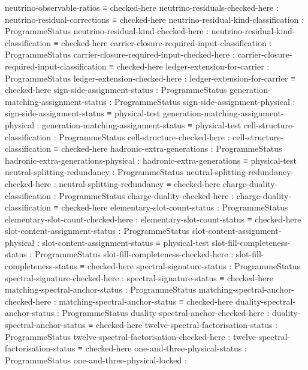 \documentclass[11pt]{article}
\begin{document}
\begin{code}
      neutrino-observable-ratios ≡ checked-here
    neutrino-residuals-checked-here :
      neutrino-residual-corrections ≡ checked-here
    neutrino-residual-kind-classification : ProgrammeStatus
    neutrino-residual-kind-checked-here :
      neutrino-residual-kind-classification ≡ checked-here
    carrier-closure-required-input-classification : ProgrammeStatus
    carrier-closure-required-input-checked-here :
      carrier-closure-required-input-classification ≡ checked-here
    ledger-extension-for-carrier  : ProgrammeStatus
    ledger-extension-checked-here :
      ledger-extension-for-carrier ≡ checked-here
    sign-side-assignment-status   : ProgrammeStatus
    generation-matching-assignment-status : ProgrammeStatus
    sign-side-assignment-physical :
      sign-side-assignment-status ≡ physical-test
    generation-matching-assignment-physical :
      generation-matching-assignment-status ≡ physical-test
    cell-structure-classification : ProgrammeStatus
    cell-structure-checked-here :
      cell-structure-classification ≡ checked-here
    hadronic-extra-generations    : ProgrammeStatus
    hadronic-extra-generations-physical :
      hadronic-extra-generations ≡ physical-test
    neutral-splitting-redundancy  : ProgrammeStatus
    neutral-splitting-redundancy-checked-here :
      neutral-splitting-redundancy ≡ checked-here
    charge-duality-classification : ProgrammeStatus
    charge-duality-checked-here   :
      charge-duality-classification ≡ checked-here
    elementary-slot-count-status  : ProgrammeStatus
    elementary-slot-count-checked-here :
      elementary-slot-count-status ≡ checked-here
    slot-content-assignment-status : ProgrammeStatus
    slot-content-assignment-physical :
      slot-content-assignment-status ≡ physical-test
    slot-fill-completeness-status : ProgrammeStatus
    slot-fill-completeness-checked-here :
      slot-fill-completeness-status ≡ checked-here
    spectral-signature-status     : ProgrammeStatus
    spectral-signature-checked-here :
      spectral-signature-status ≡ checked-here
    matching-spectral-anchor-status : ProgrammeStatus
    matching-spectral-anchor-checked-here :
      matching-spectral-anchor-status ≡ checked-here
    duality-spectral-anchor-status : ProgrammeStatus
    duality-spectral-anchor-checked-here :
      duality-spectral-anchor-status ≡ checked-here
    twelve-spectral-factorisation-status : ProgrammeStatus
    twelve-spectral-factorisation-checked-here :
      twelve-spectral-factorisation-status ≡ checked-here
    one-and-three-physical-status : ProgrammeStatus
    one-and-three-physical-locked :

\end{code}
\end{document}
